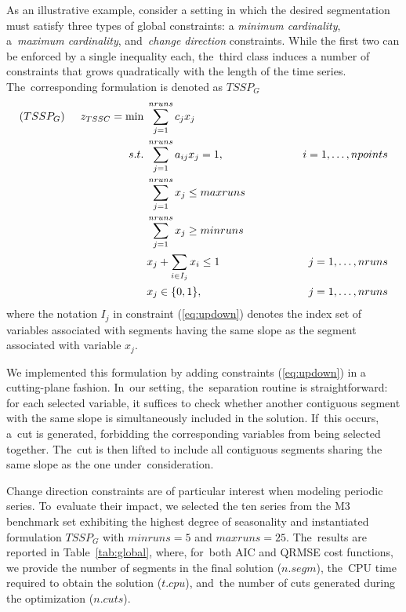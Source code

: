 \documentclass[mathematics,article,accept,pdftex,moreauthors]{Definitions/mdpi}
\begin{document}
	As an illustrative example, consider a setting in which the desired segmentation must satisfy three types of global constraints: a {\it minimum cardinality}, a~{\it maximum cardinality}, and~{\it change direction} constraints. While the first two can be enforced by a single inequality each, the~third class induces a number of constraints that grows quadratically with the length of the time series. The~corresponding formulation is denoted as $TSSP_G$
	\begin{alignat}{4}
		(TSSP_G) \hspace{0.5cm} z_{TSSC} = \min     &\; \sum_{j=1}^{nruns} c_j x_{j}  \label{eq:SCPobjG} \\
		s.t. &\; \sum_{j=1}^{nruns}a_{ij}x_{j} = 1, & \hspace{1.5cm} i=1,\dots,npoints  \label{eq:SCPcovG} \\
		&\; \sum_{j=1}^{nruns} x_{j} \leq maxruns \label{eq:SPPmaxG}\\
		&\; \sum_{j=1}^{nruns} x_{j} \geq minruns \label{eq:SPPminG}\\
		&\; x_j + \sum_{i \in I_j} x_i \leq 1  & \hspace{1.5cm} j=1,\dots,nruns  \label{eq:updown}\\
		&\; x_j \in \{0,1\},                   &\; j=1,\dots,nruns  \label{eq:SCPvarG}
	\end{alignat}
	\noindent where the notation $I_j$ in constraint (\ref{eq:updown}) denotes the index set of variables associated with segments having the same slope as the segment associated with variable $x_j$.
	
	We implemented this formulation by adding constraints (\ref{eq:updown}) in a cutting-plane fashion. In~our setting, the~separation routine is straightforward: for each selected variable, it suffices to check whether another contiguous segment with the same slope is simultaneously included in the solution. If~this occurs, a~cut is generated, forbidding the corresponding variables from being selected together. The~cut is then lifted to include all contiguous segments sharing the same slope as the one under~consideration.
	
	Change direction constraints are of particular interest when modeling periodic series. To~evaluate their impact, we selected the ten series from the M3 benchmark set exhibiting the highest degree of seasonality and instantiated formulation $TSSP_G$ with $minruns = 5$ and $maxruns = 25$. The~results are reported in Table~\ref{tab:global}, where, for~both AIC and QRMSE cost functions, we provide the number of segments in the final solution ($n.segm$), the~CPU time required to obtain the solution ($t.cpu$), and~the number of cuts generated during the optimization ($n.cuts$).
	
\end{document}
